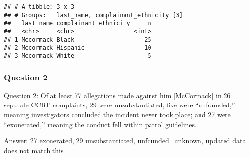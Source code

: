 \documentclass[
]{article}
\newenvironment{Shaded}{\begin{snugshade}}{\end{snugshade}}
\newcommand{\CommentTok}[1]{\textcolor[rgb]{0.56,0.35,0.01}{\textit{#1}}}
\newcommand{\KeywordTok}[1]{\textcolor[rgb]{0.13,0.29,0.53}{\textbf{#1}}}
\newcommand{\NormalTok}[1]{#1}
\newcommand{\OperatorTok}[1]{\textcolor[rgb]{0.81,0.36,0.00}{\textbf{#1}}}
\newcommand{\StringTok}[1]{\textcolor[rgb]{0.31,0.60,0.02}{#1}}
\begin{document}
\begin{Shaded}
\end{Shaded}

\begin{verbatim}
## # A tibble: 3 x 3
## # Groups:   last_name, complainant_ethnicity [3]
##   last_name complainant_ethnicity     n
##   <chr>     <chr>                 <int>
## 1 Mccormack Black                    25
## 2 Mccormack Hispanic                 10
## 3 Mccormack White                     5
\end{verbatim}

\hypertarget{question-2}{%
\subsubsection{Question 2}\label{question-2}}

Question 2: Of at least 77 allegations made against him {[}McCormack{]}
in 26 separate CCRB complaints, 29 were unsubstantiated; five were
``unfounded,'' meaning investigators concluded the incident never took
place; and 27 were ``exonerated,'' meaning the conduct fell within
patrol guidelines.

Answer: 27 exonerated, 29 unsubstantiated, unfounded=unknown, updated
data does not match this
\end{document}
